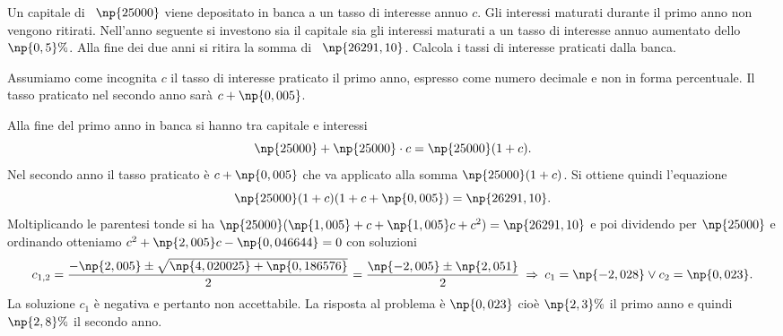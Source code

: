 \begin{problema}
Un capitale di \officialeuro~$\np{25000}$ viene depositato in banca a un tasso di interesse annuo $c$. Gli interessi maturati durante il primo anno non vengono ritirati.
Nell'anno seguente si investono sia il capitale sia gli interessi maturati a un tasso di interesse annuo aumentato dello $\np{0,5}\%$. Alla fine dei due anni si ritira
la somma di \officialeuro~$\np{26291,10}$. Calcola i tassi di interesse praticati dalla banca.
\end{problema}
Assumiamo come incognita $c$ il tasso di interesse praticato il primo anno, espresso come numero decimale e
non in forma percentuale. Il tasso praticato nel secondo anno sarà $c+\np{0,005}$.

\begin{soluzione}
Alla fine del primo anno in banca si hanno tra capitale e interessi \[\np{25000} + \np{25000} \cdot c = \np{25000} ( 1 + c ).\] Nel secondo anno il tasso praticato è $c+\np{0,005}$ che va applicato alla somma $\np{25000}(1+c)$. Si ottiene quindi l'equazione \[\np{25000} ( 1 + c ) ( 1 + c + \np{0,005} ) = \np{26291,10}.\]
Moltiplicando le parentesi tonde si ha $\np{25000} ( \np{1,005} + c + \np{1,005} c + c^{2} ) = \np{26291,10}$ e poi dividendo per $\np{25000}$ e ordinando otteniamo
$c^{2} + \np{2,005} c - \np{0,046644}=0$ con soluzioni
\[c_{1\text{,}2} = \dfrac{- \np{2,005} \pm \sqrt{\np{4,020025} + \np{0,186576}}}{2} = \dfrac{\np{-2,005} \pm \np{2,051}}{2}\:\Rightarrow\: c_{1} = \np{-2,028} \vee c_{2} = \np{0,023}.\]
La soluzione $c_1$ è negativa e pertanto non accettabile. La risposta al problema è $\np{0,023}$ cioè $\np{2,3}\%$ il primo anno e quindi $\np{2,8}\%$ il secondo anno.
\end{soluzione}

\vspazio\ovalbox{\risolvii \ref{ese:3.123}, \ref{ese:3.124}, \ref{ese:3.125}, \ref{ese:3.126}, \ref{ese:3.127}, \ref{ese:3.128}, \ref{ese:3.129}, \ref{ese:3.130}, \ref{ese:3.131}, \ref{ese:3.132},}

\vspazio\ovalbox{ \ref{ese:3.133}, \ref{ese:3.134}, \ref{ese:3.135}, \ref{ese:3.136}, \ref{ese:3.137}, \ref{ese:3.138}, \ref{ese:3.139}, \ref{ese:3.140}, \ref{ese:3.141}, \ref{ese:3.142}, \ref{ese:3.143}, \ref{ese:3.144}, \ref{ese:3.145}, }

\vspazio\ovalbox{\ref{ese:3.146}, \ref{ese:3.147},\ref{ese:3.148}, \ref{ese:3.149}, \ref{ese:3.150}, \ref{ese:3.151}, \ref{ese:3.152}, \ref{ese:3.153}, \ref{ese:3.154}, \ref{ese:3.155}, \ref{ese:3.156}, \ref{ese:3.157}, \ref{ese:3.158}, }

